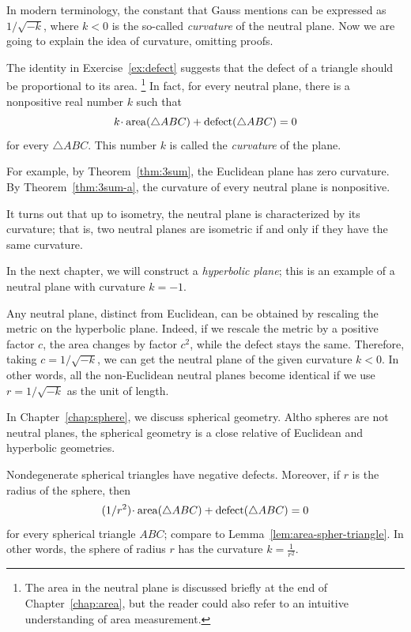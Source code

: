 In modern terminology, the constant that Gauss mentions 
can be expressed as $1/\sqrt{-k}$, 
where $k< 0$ is the so-called \emph{curvature} of the neutral plane.
Now we are going to explain the idea of curvature, omitting proofs.

The identity in Exercise~\ref{ex:defect} suggests that the defect of a triangle should be proportional to its area.%
\footnote{The area in the neutral plane is discussed briefly at the end of Chapter~\ref{chap:area},
but the reader could also refer to an intuitive understanding of area measurement.}
In fact, for every neutral plane, there is a nonpositive real number $k$
such that 
$$k\cdot\area(\triangle ABC)+\defect(\triangle ABC)=0$$
for every $\triangle ABC$.
This number $k$ is called the \emph{curvature} of the plane.

For example, by Theorem~\ref{thm:3sum}, the Euclidean plane has zero curvature.
By Theorem~\ref{thm:3sum-a}, the curvature of every neutral plane is nonpositive.

It turns out that up to isometry, the neutral plane is characterized by its curvature;
that is, two neutral planes are isometric if and only if they have the same curvature. 

In the next chapter, we will construct a {}\emph{hyperbolic plane};
this is an example of a neutral plane with curvature $k=-1$.

Any neutral plane, distinct from Euclidean,
can be obtained by rescaling the metric on the hyperbolic plane.
Indeed,
if we rescale the metric by a positive factor $c$,
the area changes by factor $c^2$, while the defect stays the same.
Therefore, taking $c=1/\sqrt{-k}$,
we can get the neutral plane of the given curvature $k<0$.
In other words, all the non-Euclidean neutral planes become identical
if we use $r=1/\sqrt{-k}$ as the unit of length.

\medskip

In Chapter~\ref{chap:sphere}, we discuss spherical geometry.
Altho spheres are not neutral planes,
the spherical geometry is a close relative of Euclidean and hyperbolic geometries.

Nondegenerate spherical triangles have negative defects.
Moreover, 
if $r$ is the radius of the sphere, then
$$\tfrac1{r^2}\cdot\area(\triangle ABC)+\defect(\triangle ABC)=0$$
for every spherical triangle $ABC$; compare to Lemma~\ref{lem:area-spher-triangle}.
In other words, 
the sphere of radius $r$ has the curvature $k=\tfrac1{r^2}$.
